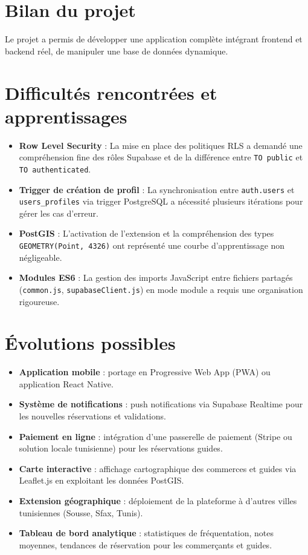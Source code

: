 \documentclass[12pt,a4paper]{report}
\begin{document}
\section{Bilan du projet}

Le projet a permis de développer une application complète intégrant frontend et backend réel, de manipuler une base de données dynamique.

\section{Difficultés rencontrées et apprentissages}

\begin{itemize}
  \item \textbf{Row Level Security} : La mise en place des politiques RLS a demandé
        une compréhension fine des rôles Supabase et de la différence entre
        \texttt{TO public} et \texttt{TO authenticated}.
  \item \textbf{Trigger de création de profil} : La synchronisation entre
        \texttt{auth.users} et \texttt{users\_profiles} via trigger PostgreSQL a
        nécessité plusieurs itérations pour gérer les cas d'erreur.
  \item \textbf{PostGIS} : L'activation de l'extension et la compréhension des
        types \texttt{GEOMETRY(Point, 4326)} ont représenté une courbe d'apprentissage
        non négligeable.
  \item \textbf{Modules ES6} : La gestion des imports JavaScript entre fichiers
        partagés (\texttt{common.js}, \texttt{supabaseClient.js}) en mode module
        a requis une organisation rigoureuse.
\end{itemize}

\section{Évolutions possibles}

\begin{itemize}
  \item \textbf{Application mobile} : portage en Progressive Web App (PWA) ou
        application React Native.
  \item \textbf{Système de notifications} : push notifications via Supabase Realtime
        pour les nouvelles réservations et validations.
  \item \textbf{Paiement en ligne} : intégration d'une passerelle de paiement
        (Stripe ou solution locale tunisienne) pour les réservations guides.
  \item \textbf{Carte interactive} : affichage cartographique des commerces et guides
        via Leaflet.js en exploitant les données PostGIS.
  \item \textbf{Extension géographique} : déploiement de la plateforme à d'autres
        villes tunisiennes (Sousse, Sfax, Tunis).
  \item \textbf{Tableau de bord analytique} : statistiques de fréquentation,
        notes moyennes, tendances de réservation pour les commerçants et guides.
\end{itemize}
\end{document}
